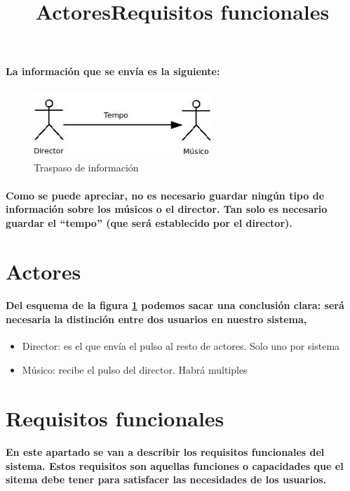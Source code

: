 \paragraph{
La información que se envía es la siguiente:
}
  \begin{figure}[htb]
  \centering
  \includegraphics[width=0.6\textwidth]{./imagenes/mensajesconceptual}
  \caption{Traspaso de información} \label{fig:mensajesconceptual}
  \end{figure}


\paragraph{
Como se puede apreciar, no es necesario guardar ningún tipo de información sobre los músicos o el director. Tan solo
es necesario guardar el ``tempo'' (que será establecido por el director).
}

\title{Actores}
\section{Actores}

\paragraph{
Del esquema de la figura \ref{fig:mensajesconceptual} podemos sacar una conclusión clara:
será necesaria la distinción entre dos usuarios en nuestro sistema,
}
  \begin{itemize}
    \item Director: es el que envía el pulso al resto de actores. Solo uno por sistema
    \item Músico: recibe el pulso del director. Habrá multiples
  \end{itemize}


\title{Requisitos funcionales}
\section{Requisitos funcionales}

\paragraph{
En este apartado se van a describir los requisitos funcionales del sistema.
Estos requisitos son aquellas funciones o capacidades que el sitema debe
tener para satisfacer las necesidades de los usuarios.
}

